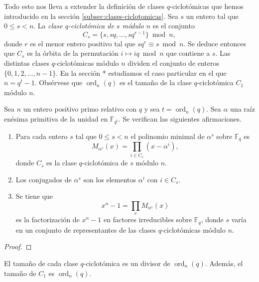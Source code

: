 Todo esto nos lleva a extender la definición de clases \(q\)-ciclotómicas que hemos introducido en la sección \ref{subsec:clases-ciclotomicas}.
Sea \(s\) un entero tal que \(0 \leq s < n\).
La \textit{clase \(q\)-ciclotómica de \(s\) módulo \(n\)} es el conjunto
\[
  C_s = \{s, sq, \dots, sq^{r-1}\} \bmod n, 
\]
donde \(r\) es el menor entero positivo tal que \(sq^r \equiv s \bmod n\).
Se deduce entonces que \(C_s\) es la órbita de la permutación \(i \mapsto iq \bmod n\) que contiene a \(s\).
Las distintas clases \(q\)-ciclotómicas módulo \(n\) dividen el conjunto de enteros \(\{0, 1, 2, \dots, n - 1\}\).
En la sección * estudiamos el caso particular en el que \(n = q^t - 1\).
Obsérvese que \(\operatorname{ord}_n(q)\) es el tamaño de la clase \(q\)-ciclotómica \(C_1\) módulo \(n\).

\begin{theorem}
  \label{th:pol-minimal-raiz-primitiva}
  Sea \(n\) un entero positivo primo relativo con \(q\) y sea \(t = \operatorname{ord}_n(q)\).
  Sea \(\alpha\) una raíz enésima primitiva de la unidad en \(\mathbb F_{q^t}\).
  Se verifican las siguientes afirmaciones.
  \begin{enumerate}
    \item Para cada entero \(s\) tal que \(0 \leq s < n\) el polinomio minimal de \(\alpha^s\) sobre \(\mathbb F_q\) es
    \[
      M_{\alpha^s}(x) = \prod_{i \in C_s}(x - \alpha^i),
    \]
    donde \(C_s\) es la clase \(q\)-ciclotómica de \(s\) módulo \(n\).
    \label{thi:pol-minimal-raiz-primitiva-producto}
    \item Los conjugados de \(\alpha^s\) son los elementos \(\alpha^i\) con \(i \in C_s\).
    \item Se tiene que
    \[
      x^n - 1 = \prod_s M_{\alpha^s}(x)
    \]
    es la factorización de \(x^n - 1\) en factores irreducibles sobre \(\mathbb F_q\), donde \(s\) varía en un conjunto de representantes de las clases \(q\)-ciclotómicas módulo \(n\).
  \end{enumerate}
\end{theorem}

\begin{proof}
\end{proof}

\begin{theorem}
  El tamaño de cada clase \(q\)-ciclotómica es un divisor de \(\operatorname{ord}_n(q)\).
  Además, el tamaño de \(C_1\) es \(\operatorname{ord}_n(q)\).
\end{theorem}

